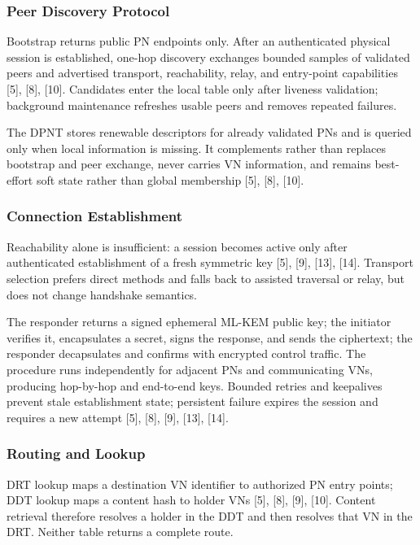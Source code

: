 \documentclass[12pt,a4paper]{article}
\begin{document}
\subsubsection{Peer Discovery Protocol}

Bootstrap returns public PN endpoints only. After an authenticated physical session is established, one-hop discovery exchanges bounded samples of validated peers and advertised transport, reachability, relay, and entry-point capabilities [5], [8], [10]. Candidates enter the local table only after liveness validation; background maintenance refreshes usable peers and removes repeated failures.

The DPNT stores renewable descriptors for already validated PNs and is queried only when local information is missing. It complements rather than replaces bootstrap and peer exchange, never carries VN information, and remains best-effort soft state rather than global membership [5], [8], [10].


\subsubsection{Connection Establishment}

Reachability alone is insufficient: a session becomes active only after authenticated establishment of a fresh symmetric key [5], [9], [13], [14]. Transport selection prefers direct methods and falls back to assisted traversal or relay, but does not change handshake semantics.

The responder returns a signed ephemeral ML-KEM public key; the initiator verifies it, encapsulates a secret, signs the response, and sends the ciphertext; the responder decapsulates and confirms with encrypted control traffic. The procedure runs independently for adjacent PNs and communicating VNs, producing hop-by-hop and end-to-end keys. Bounded retries and keepalives prevent stale establishment state; persistent failure expires the session and requires a new attempt [5], [8], [9], [13], [14].

\subsubsection{Routing and Lookup}

DRT lookup maps a destination VN identifier to authorized PN entry points; DDT lookup maps a content hash to holder VNs [5], [8], [9], [10]. Content retrieval therefore resolves a holder in the DDT and then resolves that VN in the DRT. Neither table returns a complete route.
\end{document}
